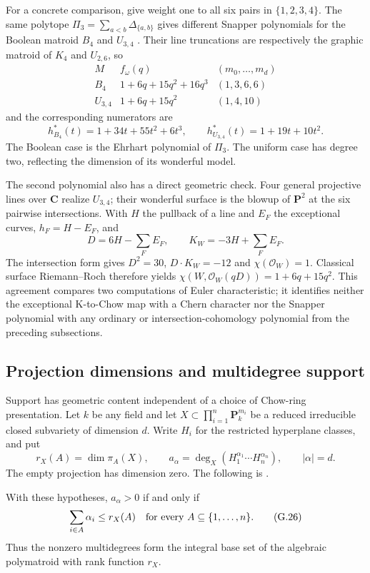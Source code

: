 For a concrete comparison, give weight one to all six pairs
in $\{1,2,3,4\}$. The same polytope
$\Pi_3=\sum_{a<b}\Delta_{\{a,b\}}$ gives different Snapper
polynomials for the Boolean matroid $B_4$ and $U_{3,4}$
\cite[Example~3.11 and Table~1]{Li26Snapper}. Their line
truncations are respectively the graphic matroid of $K_4$
and $U_{2,6}$, so
\[
 \begin{array}{c|l|c}
 M&f_\omega(q)&(m_0,\ldots,m_d)\\ \hline
 B_4&1+6q+15q^2+16q^3&(1,3,6,6)\\
 U_{3,4}&1+6q+15q^2&(1,4,10)
 \end{array}
\]
and the corresponding numerators are
\[
 h_{B_4}^*(t)=1+34t+55t^2+6t^3,\qquad
 h_{U_{3,4}}^*(t)=1+19t+10t^2.
\]
The Boolean case is the Ehrhart polynomial of $\Pi_3$.
The uniform case has degree two, reflecting the dimension of
its wonderful model.

The second polynomial also has a direct geometric check.
Four general projective lines over $\mathbf C$ realize
$U_{3,4}$; their wonderful surface is the blowup of
$\mathbf P^2$ at the six pairwise intersections. With
$H$ the pullback of a line and $E_F$ the exceptional curves,
$h_F=H-E_F$, and
\[
 D=6H-\sum_F E_F,\qquad K_W=-3H+\sum_F E_F.
\]
The intersection form gives $D^2=30$, $D\cdot K_W=-12$
and $\chi(\mathcal O_W)=1$. Classical surface
Riemann--Roch therefore yields
$\chi(W,\mathcal O_W(qD))=1+6q+15q^2$.
This agreement compares two computations of Euler
characteristic; it identifies neither the exceptional
K-to-Chow map with a Chern character nor the Snapper
polynomial with any ordinary or intersection-cohomology
polynomial from the preceding subsections.

\subsection{Projection dimensions and multidegree support}
\label{sec:appG-multidegree-support}

Support has geometric content independent of a choice of Chow-ring
presentation. Let $k$ be any field and let
$X\subset\prod_{i=1}^n\mathbf P^{m_i}_k$ be a reduced
irreducible closed subvariety of dimension $d$. Write $H_i$
for the restricted hyperplane classes, and put
\[
 r_X(A)=\dim\pi_A(X),\qquad
 a_\alpha=\deg_X(H_1^{\alpha_1}\cdots H_n^{\alpha_n}),
 \qquad |\alpha|=d.
\tag{G.25}\label{eq:appG-projection-rank}
\]
The empty projection has dimension zero. The following is
\cite[Theorem~3.12]{CastilloCidRuizLiMontanoZhang20MultidegreesPublished}.
\begin{theorem}
\label{thm:appG-multidegree-support}
With these hypotheses, $a_\alpha>0$ if and only if
\[
 \sum_{i\in A}\alpha_i\leq r_X(A)
                 \quad\hbox{for every }A\subseteq\{1,\ldots,n\}.
\tag{G.26}\label{eq:appG-multidegree-inequalities}
\]
Thus the nonzero multidegrees form the integral base set of the
algebraic polymatroid with rank function $r_X$.
\end{theorem}

